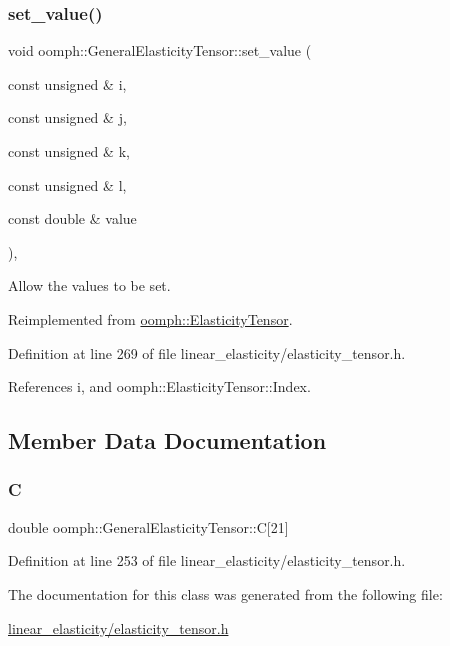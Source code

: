 \subsubsection{\texorpdfstring{set\+\_\+value()}{set\_value()}}
{\footnotesize\ttfamily void oomph\+::\+General\+Elasticity\+Tensor\+::set\+\_\+value (\begin{DoxyParamCaption}\item[{const unsigned \&}]{i,  }\item[{const unsigned \&}]{j,  }\item[{const unsigned \&}]{k,  }\item[{const unsigned \&}]{l,  }\item[{const double \&}]{value }\end{DoxyParamCaption})\hspace{0.3cm}{\ttfamily [inline]}, {\ttfamily [virtual]}}



Allow the values to be set. 



Reimplemented from \hyperlink{classoomph_1_1ElasticityTensor_ab68e4386f02f9e39095d879e4ec96df5}{oomph\+::\+Elasticity\+Tensor}.



Definition at line 269 of file linear\+\_\+elasticity/elasticity\+\_\+tensor.\+h.



References i, and oomph\+::\+Elasticity\+Tensor\+::\+Index.



\subsection{Member Data Documentation}
\mbox{\label{classoomph_1_1GeneralElasticityTensor_afc3c4afaaa1eef1c57913e1e20c0d483}} 
\subsubsection{\texorpdfstring{C}{C}}
{\footnotesize\ttfamily double oomph\+::\+General\+Elasticity\+Tensor\+::C\mbox{[}21\mbox{]}\hspace{0.3cm}{\ttfamily [private]}}



Definition at line 253 of file linear\+\_\+elasticity/elasticity\+\_\+tensor.\+h.



The documentation for this class was generated from the following file\+:\begin{DoxyCompactItemize}
\item 
\hyperlink{linear__elasticity_2elasticity__tensor_8h}{linear\+\_\+elasticity/elasticity\+\_\+tensor.\+h}\end{DoxyCompactItemize}
